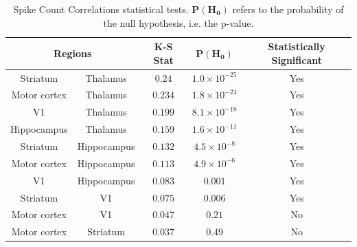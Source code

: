 \documentclass[a4paper,12pt]{article}
\theoremstyle{definition}
\begin{document}
\begin{table}[ht!]
  \begin{center}
    \caption{Spike Count Correlations statistical tests. $\mathbf{P(H_0)}$ refers to the probability of the null hypothesis, i.e. the p-value.}
    \label{tab:corr_ks_test}
    \begin{tabular}{c|c|c|c|c} %
      \multicolumn{2}{c|}{\textbf{Regions}} & \textbf{K-S Stat} & $\mathbf{P(H_0)}$ & \textbf{Statistically Significant}\\
      \hline
      Striatum & Thalamus & $0.24$ & $1.0 \times 10^{-25}$ & Yes \\
      Motor cortex & Thalamus & $0.234$ & $1.8 \times 10^{-24}$ & Yes \\
      V1 & Thalamus  & $0.199$ & $8.1 \times 10^{-18}$ & Yes \\
      Hippocampus & Thalamus  & $0.159$ & $1.6 \times 10^{-11}$ & Yes \\
      Striatum & Hippocampus & $0.132$ & $4.5 \times 10^{-8}$ & Yes \\
      Motor cortex & Hippocampus & $0.113$ & $4.9 \times 10^{-6}$ & Yes \\
      V1 & Hippocampus & $0.083$ & $0.001$ & Yes \\
      Striatum & V1 & $0.075$ & $0.006$ & Yes \\
      Motor cortex & V1 & $0.047$ & $0.21$ & No \\
      Motor cortex & Striatum & $0.037$ & $0.49$ & No \\
    \end{tabular}
  \end{center}
\end{table}
\end{document}

